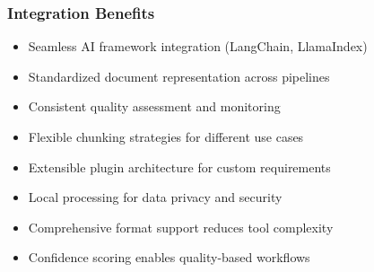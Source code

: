 \begin{frame}[fragile]\frametitle{Integration Benefits}
      \begin{itemize}
	\item Seamless AI framework integration (LangChain, LlamaIndex)
	\item Standardized document representation across pipelines
	\item Consistent quality assessment and monitoring
	\item Flexible chunking strategies for different use cases
	\item Extensible plugin architecture for custom requirements
	\item Local processing for data privacy and security
	\item Comprehensive format support reduces tool complexity
	\item Confidence scoring enables quality-based workflows
	  \end{itemize}
\end{frame}

